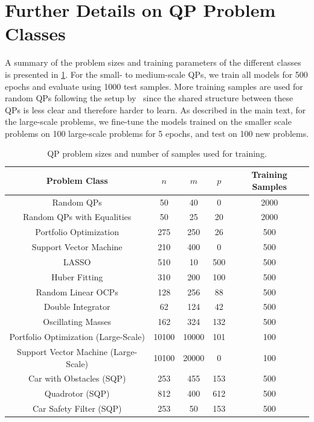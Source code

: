 \documentclass{article} %
\begin{document}
\section{Further Details on QP Problem Classes}
\label{appendix:problem_classes}

A summary of the problem sizes and training parameters of the different classes is presented in \cref{table:qp_problem_sizes}. For the small- to medium-scale QPs, we train all models for 500 epochs and evaluate using 1000 test samples. More training samples are used for random QPs following the setup by~\citet{saravanos2025deep} since the shared structure between these QPs is less clear and therefore harder to learn.
As described in the main text, for the large-scale problems, we fine-tune the models trained on the smaller scale problems on 100 large-scale problems for 5 epochs, and test on 100 new problems.

\begin{table}[h]
\centering
\caption{QP problem sizes and number of samples used for training.}
\label{table:qp_problem_sizes}
\begin{tabular}{c|c|c|c|c}
Problem Class & $n$ & $m$ & $p$ & Training Samples \\
\hline
Random QPs & 50 & 40 & 0 & 2000 \\
Random QPs with Equalities & 50 & 25 & 20 & 2000 \\
Portfolio Optimization & 275 & 250 & 26 & 500 \\
Support Vector Machine & 210 & 400 & 0 & 500 \\
LASSO & 510 & 10 & 500 & 500 \\
Huber Fitting & 310 & 200 & 100 & 500 \\
Random Linear OCPs & 128 & 256 & 88 & 500 \\
Double Integrator & 62 & 124 & 42 & 500 \\
Oscillating Masses & 162 & 324 & 132 & 500 \\
Portfolio Optimization (Large-Scale) & 10100 & 10000 & 101 & 100 \\
Support Vector Machine (Large-Scale) & 10100 & 20000 & 0 & 100 \\
Car with Obstacles (SQP) & 253 & 455 & 153 & 500 \\
Quadrotor (SQP) & 812 & 400 & 612 & 500 \\
Car Safety Filter (SQP) & 253 & 50 & 153 & 500
\end{tabular}
\end{table}
\end{document}
